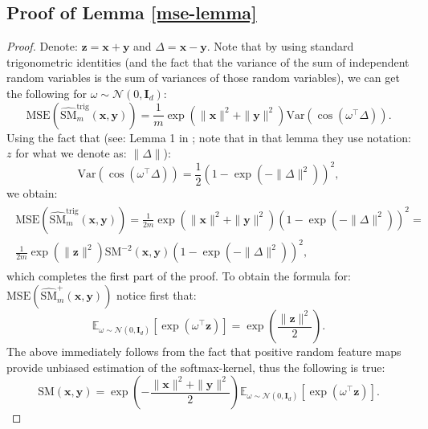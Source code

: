 \subsection{Proof of Lemma \ref{mse-lemma}}
\begin{proof}
Denote: $\mathbf{z}=\mathbf{x}+\mathbf{y}$ and $\Delta=\mathbf{x}-\mathbf{y}$.
Note that by using standard trigonometric identities (and the fact that the variance of the sum of independent random variables is the sum of variances of those random variables), we can get the following for $\omega \sim \mathcal{N}(0, \mathbf{I}_{d})$:
\begin{equation}
\mathrm{MSE}(\widehat{\mathrm{SM}}^{\mathrm{trig}}_{m}(\mathbf{x}, \mathbf{y})) = \frac{1}{m}\exp(\|\mathbf{x}\|^{2}+\|\mathbf{y}\|^{2}) \mathrm{Var}(\cos(\omega^{\top}\Delta)).     
\end{equation}
Using the fact that (see: Lemma 1 in \citep{ort}; note that in that lemma they use notation: $z$ for what we denote as: $\|\Delta\|$):
\begin{equation}
\mathrm{Var}(\cos(\omega^{\top}\Delta))=\frac{1}{2}(1-\exp(-\|\Delta\|^{2}))^{2},    
\end{equation}
we obtain:
\begin{align}
\begin{split}
\mathrm{MSE}(\widehat{\mathrm{SM}}^{\mathrm{trig}}_{m}(\mathbf{x}, \mathbf{y})) = \frac{1}{2m}\exp(\|\mathbf{x}\|^{2}+\|\mathbf{y}\|^{2})(1-\exp(-\|\Delta\|^{2}))^{2} = \\
\frac{1}{2m} \exp(\|\mathbf{z}\|^{2})\mathrm{SM}^{-2}(\mathbf{x},\mathbf{y})(1-\exp(-\|\Delta\|^{2}))^{2},
\end{split}
\end{align}
which completes the first part of the proof.
To obtain the formula for: $\mathrm{MSE}(\widehat{\mathrm{SM}}^{\mathrm{+}}_{m}(\mathbf{x}, \mathbf{y}))$
notice first that:
\begin{equation}
\label{neat-fact}
\mathbb{E}_{\omega \sim \mathcal{N}(0, \mathbf{I}_{d})}[\exp(\omega^{\top}\mathbf{z})] = \exp(\frac{\|\mathbf{z}\|^{2}}{2}).    
\end{equation}
The above immediately follows from the fact that positive random feature maps provide unbiased estimation of the softmax-kernel, thus the following is true:
\begin{equation}
\mathrm{SM}(\mathbf{x}, \mathbf{y}) = \exp(-\frac{\|\mathbf{x}\|^{2}+\|\mathbf{y}\|^{2}}{2})\mathbb{E}_{\omega \sim \mathcal{N}(0, \mathbf{I}_{d})}[\exp(\omega^{\top}\mathbf{z})].    
\end{equation}


\end{proof}
